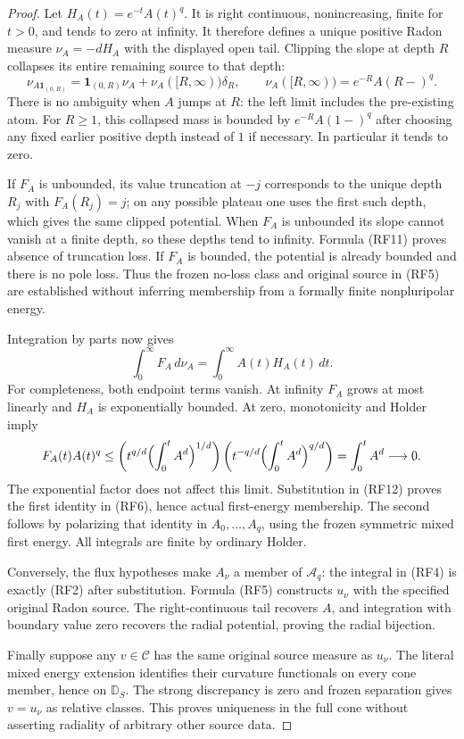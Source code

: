 \begin{proof}
Let $H_A(t)=e^{-t}A(t)^q$.  It is right continuous,
nonincreasing, finite for $t>0$, and tends to zero at
infinity.  It therefore defines a unique positive Radon
measure $\nu_A=-dH_A$ with the displayed open tail.
Clipping the slope at depth $R$ collapses its entire
remaining source to that depth:
\[
 \nu_{A\mathbf1_{(0,R)}}
       =\mathbf1_{(0,R)}\nu_A+\nu_A([R,\infty))\delta_R,
 \qquad
 \nu_A([R,\infty))=e^{-R}A(R-)^q.
 \tag{RF11}
\]
There is no ambiguity when $A$ jumps at $R$: the left
limit includes the pre-existing atom.  For $R\ge1$,
this collapsed mass is bounded by $e^{-R}A(1-)^q$
after choosing any fixed earlier positive depth instead
of $1$ if necessary.  In particular it tends to zero.

If $F_A$ is unbounded, its value truncation at $-j$
corresponds to the unique depth $R_j$ with $F_A(R_j)=j$;
on any possible plateau one uses the first such depth,
which gives the same clipped potential.  When $F_A$
is unbounded its slope cannot vanish at a finite depth,
so these depths tend to infinity.  Formula \textup{(RF11)}
proves absence of truncation loss.  If $F_A$ is bounded,
the potential is already bounded and there is no pole
loss.  Thus the frozen no-loss class and original source
in \textup{(RF5)} are established without inferring
membership from a formally finite nonpluripolar energy.

Integration by parts now gives
\[
              \int_0^\infty F_A\,d\nu_A
                   =\int_0^\infty A(t)H_A(t)\,dt.
 \tag{RF12}
\]
For completeness, both endpoint terms vanish.  At infinity
$F_A$ grows at most linearly and $H_A$ is exponentially
bounded.  At zero, monotonicity and Holder imply
\[
 F_A(t)A(t)^q
 \le \left(t^{q/d}\Bigl(\int_0^t A^d\Bigr)^{1/d}\right)
       \left(t^{-q/d}\Bigl(\int_0^t A^d\Bigr)^{q/d}\right)
 =\int_0^t A^d\longrightarrow0.
\]
The exponential factor does not affect this limit.
Substitution in \textup{(RF12)} proves the first identity
in \textup{(RF6)}, hence actual first-energy membership.
The second follows by polarizing that identity in
$A_0,\ldots,A_q$, using the frozen symmetric mixed first
energy.  All integrals are finite by ordinary Holder.

Conversely, the flux hypotheses make $A_\nu$ a member
of $\mathscr A_q$: the integral in \textup{(RF4)} is
exactly \textup{(RF2)} after substitution.  Formula
\textup{(RF5)} constructs $u_\nu$ with the specified
original Radon source.  The right-continuous tail recovers
$A$, and integration with boundary value zero recovers
the radial potential, proving the radial bijection.

Finally suppose any $v\in\mathscr C$ has the same
original source measure as $u_\nu$.  The literal mixed
energy extension identifies their curvature functionals
on every cone member, hence on $\mathbb D_S$.
The strong discrepancy is zero and frozen separation
gives $v=u_\nu$ as relative classes.  This proves
uniqueness in the full cone without asserting radiality
of arbitrary other source data.
\end{proof}

